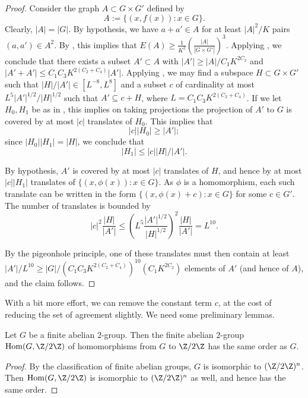 \begin{proof}\leanok Consider the graph $A \subset G \times G'$ defined by
$$ A := \{ (x,f(x)): x \in G \}.$$
Clearly, $|A| = |G|$.  By hypothesis, we have $a+a' \in A$ for at least
$|A|^2/K$ pairs $(a,a') \in A^2$. By , this implies that
$E(A) \geq \frac{1}{K^2} \left( \frac{|A|}{|G \times G'|} \right)^3$.  Applying , we conclude that there exists a subset
$A' \subset A$ with $|A'| \geq |A|/C_1 K^{2C_2}$ and $|A'+A'| \leq C_1C_3
K^{2(C_2+C_4)} |A'|$. Applying , we may find a subspace $H
\subset G \times G'$ such that $|H| / |A'| \in [L^{-8}, L^{8}]$ and a subset
$c$ of cardinality at most $L^5 |A'|^{1/2} / |H|^{1/2}$ such that $A'
\subseteq c + H$, where $L =  C_1C_3 K^{2(C_2+C_4)}$. If we let $H_0,H_1$ be
as in , this implies on taking projections the projection of
$A'$ to $G$ is covered by at most $|c|$ translates of $H_0$.  This implies
that
$$ |c| |H_0| \geq |A'|;$$
since $|H_0| |H_1| = |H|$, we conclude that
$$ |H_1| \leq |c| |H|/|A'|.$$

By hypothesis, $A'$ is covered by at most $|c|$ translates of $H$, and hence
by at most $|c| |H_1|$ translates of $\{ (x,\phi(x)): x \in G \}$.  As $\phi$
is a homomorphism, each such translate can be written in the form $\{
(x,\phi(x)+c): x \in G \}$ for some $c \in G'$. The number of translates is
bounded by
$$
|c|^2 \frac{|H|}{|A'|} \leq \left(L^5 \frac{|A'|^{1/2}}{|H|^{1/2}}\right)^2 \frac{|H|}{|A'|} = L^{10}.
$$

By the pigeonhole principle, one of these translates must then contain at
least $|A'|/L^{10} \geq |G| / (C_1C_3 K^{2(C_2+C_4)})^{10} (C_1 K^{2C_2})$
elements of $A'$ (and hence of $A$), and the claim follows.
\end{proof}

With a bit more effort, we can remove the constant term $c$, at the cost of reducing the set of agreement slightly.  We need some preliminary lemmas.

\begin{lemma}[Duality]\label{gdual}\leanok Let $G$ be a finite abelian $2$-group.  Then the finite abelian $2$-group $\mathrm{Hom}(G,\Z/2\Z)$ of homomorphisms from $G$ to $\Z/2\Z$ has the same order as $G$.
\end{lemma}

\begin{proof}\leanok By the classification of finite abelian groups, $G$ is isomorphic to $(\Z/2\Z)^n$.  Then $\mathrm{Hom}(G,\Z/2\Z)$ is isomorphic to $(\Z/2\Z)^n$ as well, and hence has the same order.
\end{proof}

